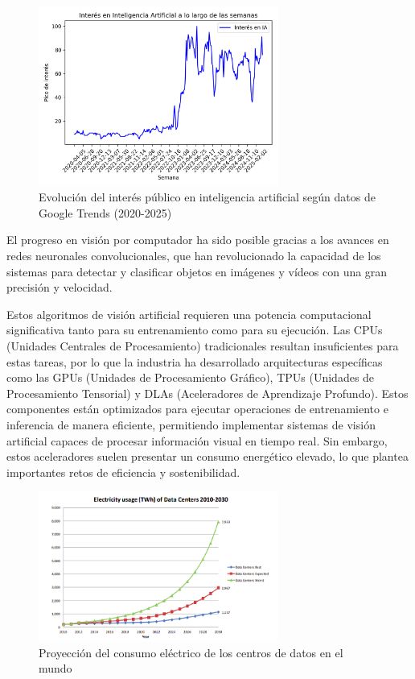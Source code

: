 \documentclass[11pt,spanish,listoffigures,listoftables]{tfgetsinf}
\begin{document}
\begin{figure}[H]
   \centering
   \includegraphics[width=0.7\textwidth]{excels/introduccion/interes_en_ia.png}
   \caption{Evolución del interés público en inteligencia artificial según datos de Google Trends (2020-2025)}
\label{fig:interes_en_inteligencia_artificial}
\end{figure}

El progreso en visión por computador ha sido posible gracias a los avances en redes neuronales convolucionales, que han revolucionado la capacidad de los sistemas para detectar y clasificar objetos en imágenes y vídeos con una gran precisión y velocidad.

Estos algoritmos de visión artificial requieren una potencia computacional significativa tanto para su entrenamiento como para su ejecución. Las CPUs (Unidades Centrales de Procesamiento) tradicionales resultan insuficientes para estas tareas, por lo que la industria ha desarrollado arquitecturas específicas como las GPUs (Unidades de Procesamiento Gráfico), TPUs (Unidades de Procesamiento Tensorial) y DLAs (Aceleradores de Aprendizaje Profundo). Estos componentes están optimizados para ejecutar operaciones de entrenamiento e inferencia de manera eficiente, permitiendo implementar sistemas de visión artificial capaces de procesar información visual en tiempo real. Sin embargo, estos aceleradores suelen presentar un consumo energético elevado, lo que plantea importantes retos de eficiencia y sostenibilidad.


\begin{figure}[H]
   \centering
   \includegraphics[width=0.7\textwidth]{images/introduccion/consumo_electrico_datacenters.png}
   \caption{Proyección del consumo eléctrico de los centros de datos en el mundo}
\label{fig:consumo_electrico_datacenters}
\end{figure}
\end{document}
